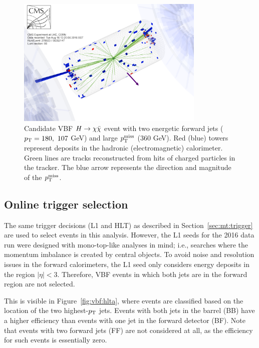 \begin{figure}[]
    \begin{center}
        \includegraphics[width=0.8\textwidth]{figures/vbf/misc/event_display.png}
        \caption{Candidate VBF $H\rightarrow\chi\bar\chi$ event with two energetic forward jets ($p_\mathrm{T}=180,~107$ GeV) and large $p_\mathrm{T}^\mathrm{miss}$ ($360$ GeV).
                 Red (blue) towers represent deposits in the hadronic (electromagnetic) calorimeter.
                 Green lines are tracks reconstructed from hits of charged particles in the tracker. 
                 The blue arrow represents the direction and magnitude of the $p_\mathrm{T}^\mathrm{miss}$.}
        \label{fig:vbf:ed}
    \end{center}
\end{figure}

\subsection{Online trigger selection}

The same trigger decisions (L1 and HLT) as described in Section~\ref{sec:mt:trigger} are used to select events in this analysis.
However, the L1 seeds for the 2016 data run were designed with mono-top-like analyses in mind; i.e., searches where the momentum imbalance is created by central objects.
To avoid noise and resolution issues in the forward calorimeters, the L1 seed only considers energy deposits in the region ${|\eta|<3}$. 
Therefore, VBF events in which both jets are in the forward region are not selected.  

This is visible in Figure~\ref{fig:vbf:hlta}, where events are classified based on the location of the two highest-$p_\mathrm{T}$ jets.
Events with both jets in the barrel (BB) have a higher efficiency than events with one jet in the forward detector (BF).
Note that events with two forward jets (FF) are not considered at all, as the efficiency for such events is essentially zero. 

